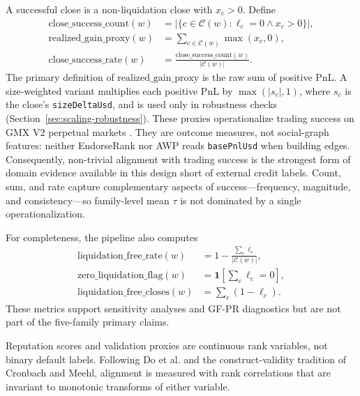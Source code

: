
A successful close is a non-liquidation close with $x_c>0$. Define
\begin{align}
\mathrm{close\_success\_count}(w)
&=
\bigl|\{c\in\mathcal{C}(w):\ell_c=0\land x_c>0\}\bigr|,
\label{eq:success-count}\\
\mathrm{realized\_gain\_proxy}(w)
&=
\sum_{c\in\mathcal{C}(w)} \max(x_c,0),
\label{eq:realized-gain}\\
\mathrm{close\_success\_rate}(w)
&=
\frac{\mathrm{close\_success\_count}(w)}{|\mathcal{C}(w)|}.
\label{eq:success-rate}
\end{align}
The primary definition of $\mathrm{realized\_gain\_proxy}$ is the raw sum of positive PnL. A size-weighted variant multiplies each positive PnL by $\max(|s_c|,1)$, where $s_c$ is the close's \texttt{sizeDeltaUsd}, and is used only in robustness checks (Section~\ref{sec:scaling-robustness}). These proxies operationalize trading success on GMX V2 perpetual markets . They are outcome measures, not social-graph features: neither EndorseRank nor AWP reads \texttt{basePnlUsd} when building edges. Consequently, non-trivial alignment with trading success is the strongest form of domain evidence available in this design short of external credit labels. Count, sum, and rate capture complementary aspects of success---frequency, magnitude, and consistency---so family-level mean $\tau$ is not dominated by a single operationalization.


For completeness, the pipeline also computes
\begin{align}
\mathrm{liquidation\_free\_rate}(w)
&=
1-\frac{\sum_c \ell_c}{|\mathcal{C}(w)|},
\label{eq:liq-free-rate}\\
\mathrm{zero\_liquidation\_flag}(w)
&=
\mathbf{1}\!\left[\sum_c \ell_c=0\right],
\label{eq:zero-liq}\\
\mathrm{liquidation\_free\_closes}(w)
&=
\sum_c (1-\ell_c).
\label{eq:liq-free-closes}
\end{align}
These metrics support sensitivity analyses and GF-PR diagnostics but are not part of the five-family primary claims.


Reputation scores and validation proxies are continuous rank variables, not binary default labels. Following Do et al. and the construct-validity tradition of Cronbach and Meehl, alignment is measured with rank correlations that are invariant to monotonic transforms of either variable.

